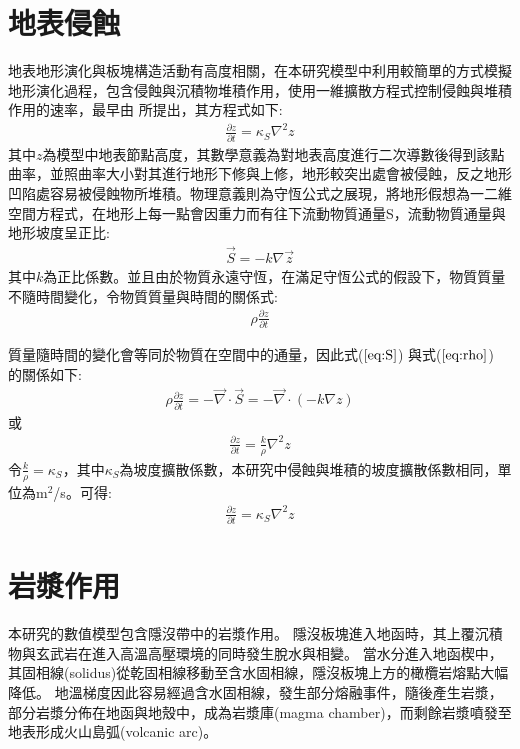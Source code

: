 \section{地表侵蝕}
地表地形演化與板塊構造活動有高度相關，在本研究模型中利用較簡單的方式模擬地形演化過程，包含侵蝕與沉積物堆積作用，使用一維擴散方程式控制侵蝕與堆積作用的速率，最早由\citealp{culling1960analytical} 所提出，其方程式如下:
\begin{align}
\frac{\partial z}{\partial t} = \kappa_S \nabla^2 z \label{eq:erosion}
\end{align}
其中$z$為模型中地表節點高度，其數學意義為對地表高度進行二次導數後得到該點曲率，並照曲率大小對其進行地形下修與上修，地形較突出處會被侵蝕，反之地形凹陷處容易被侵蝕物所堆積。物理意義則為守恆公式之展現，將地形假想為一二維空間方程式，在地形上每一點會因重力而有往下流動物質通量S，流動物質通量與地形坡度呈正比:
\begin{align}
\vec S = -k\nabla \vec z \label{eq:S}
\end{align}
其中$k$為正比係數。並且由於物質永遠守恆，在滿足守恆公式的假設下，物質質量不隨時間變化，令物質質量與時間的關係式:
\begin{align}
\rho\frac{\partial z}{\partial t}\label{eq:rho}
\end{align}

質量隨時間的變化會等同於物質在空間中的通量，因此式($\ref{eq:S}$) 與式($\ref{eq:rho}$) 的關係如下:
\begin{align}
\rho\frac{\partial z}{\partial t} = -\vec\nabla\cdot \vec S = -\vec\nabla \cdot (-k\nabla z)\label{eq:erosion2}
\end{align}
或
\begin{align}
\frac{\partial z}{\partial t} = \frac{k}{\rho}\nabla^2 z\label{eq:erosion3}
\end{align}
令$\frac{k}{\rho}=\kappa_S$，其中$\kappa_S$為坡度擴散係數，本研究中侵蝕與堆積的坡度擴散係數相同，單位為m${^2}$/s。可得:
\begin{align}
\frac{\partial z}{\partial t} = \kappa_S\nabla^2 z\label{eq:erosion4}
\end{align}

\section{岩漿作用}\label{岩漿作用}
本研究的數值模型包含隱沒帶中的岩漿作用。
隱沒板塊進入地函時，其上覆沉積物與玄武岩在進入高溫高壓環境的同時發生脫水與相變。
當水分進入地函楔中，其固相線(solidus)從乾固相線移動至含水固相線，隱沒板塊上方的橄欖岩熔點大幅降低。
地溫梯度因此容易經過含水固相線，發生部分熔融事件，隨後產生岩漿，部分岩漿分佈在地函與地殼中，成為岩漿庫(magma chamber)，而剩餘岩漿噴發至地表形成火山島弧(volcanic arc)。


